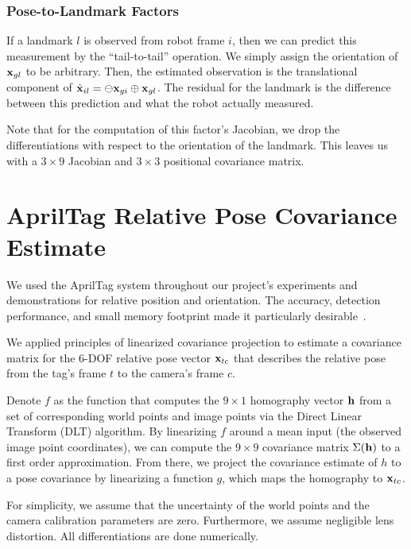 \documentclass[conference]{IEEEtran}
\begin{document}
\subsubsection{Pose-to-Landmark Factors}
\label{subs:pointnodelinear}

If a landmark $l$ is observed from robot frame $i$, then we can predict this measurement
by the ``tail-to-tail'' operation.  We simply assign the orientation of ${\bf x}_{gl}$ to
be arbitrary.  Then, the estimated observation is the translational component of $ {\hat
  {\bf x}}_{il} = \ominus {\bf x}_{gi} \oplus {\bf x}_{gl} $. The residual for the
landmark is the difference between this prediction and what the robot actually measured.

Note that for the computation of this factor's Jacobian, we drop the differentiations with
respect to the orientation of the landmark.  This leaves us with a $3 \times 9$ Jacobian
and $3 \times 3$ positional covariance matrix. 

\section{AprilTag Relative Pose Covariance Estimate}
\label{sec:apriltags}


We used the AprilTag system throughout our project's experiments and demonstrations for
relative position and orientation.  The accuracy, detection performance, and small memory
footprint made it particularly desirable~\cite{olson2011tags}.

We applied principles of linearized covariance projection to estimate a covariance matrix
for the 6-\ac{DOF} relative pose vector ${\bf x}_{tc}$ that describes the relative pose from
the tag's frame $t$ to the camera's frame $c$.

Denote $f$ as the function that computes the $9 \times 1$ homography vector ${\bf h}$ from
a set of corresponding world points and image points via the Direct Linear Transform (DLT)
algorithm. By linearizing $f$ around a mean input (the observed image point coordinates),
we can compute the $9 \times 9$ covariance matrix $\Sigma({\bf h})$ to a first order
approximation. From there, we project the covariance estimate of $h$ to a pose covariance
by linearizing a function $g$, which maps the homography to ${\bf x}_{tc}$.

For simplicity, we assume that the uncertainty of the world points and the camera
calibration parameters are zero.  Furthermore, we assume negligible lens distortion.  All
differentiations are done numerically.
\end{document}
